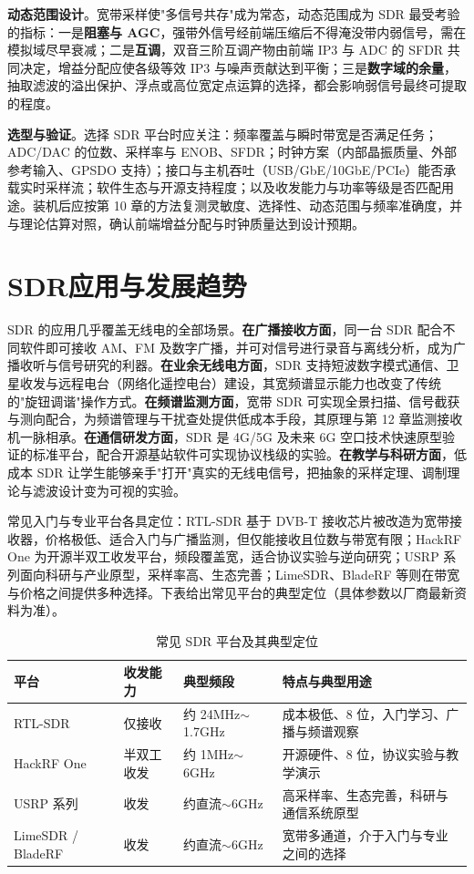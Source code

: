 \textbf{动态范围设计}。宽带采样使"多信号共存"成为常态，动态范围成为 SDR 最受考验的指标：一是\textbf{阻塞与 AGC}，强带外信号经前端压缩后不得淹没带内弱信号，需在模拟域尽早衰减；二是\textbf{互调}，双音三阶互调产物由前端 IP3 与 ADC 的 SFDR 共同决定，增益分配应使各级等效 IP3 与噪声贡献达到平衡；三是\textbf{数字域的余量}，抽取滤波的溢出保护、浮点或高位宽定点运算的选择，都会影响弱信号最终可提取的程度。

\textbf{选型与验证}。选择 SDR 平台时应关注：频率覆盖与瞬时带宽是否满足任务；ADC/DAC 的位数、采样率与 ENOB、SFDR；时钟方案（内部晶振质量、外部参考输入、GPSDO 支持）；接口与主机吞吐（USB/GbE/10GbE/PCIe）能否承载实时采样流；软件生态与开源支持程度；以及收发能力与功率等级是否匹配用途。装机后应按第 10 章的方法复测灵敏度、选择性、动态范围与频率准确度，并与理论估算对照，确认前端增益分配与时钟质量达到设计预期。

\section{SDR应用与发展趋势}
\label{sec:sdr_applications}

SDR 的应用几乎覆盖无线电的全部场景。\textbf{在广播接收方面}，同一台 SDR 配合不同软件即可接收 AM、FM 及数字广播，并可对信号进行录音与离线分析，成为广播收听与信号研究的利器。\textbf{在业余无线电方面}，SDR 支持短波数字模式通信、卫星收发与远程电台（网络化遥控电台）建设，其宽频谱显示能力也改变了传统的"旋钮调谐"操作方式。\textbf{在频谱监测方面}，宽带 SDR 可实现全景扫描、信号截获与测向配合，为频谱管理与干扰查处提供低成本手段，其原理与第 12 章监测接收机一脉相承。\textbf{在通信研发方面}，SDR 是 4G/5G 及未来 6G 空口技术快速原型验证的标准平台，配合开源基站软件可实现协议栈级的实验。\textbf{在教学与科研方面}，低成本 SDR 让学生能够亲手"打开"真实的无线电信号，把抽象的采样定理、调制理论与滤波设计变为可视的实验。

常见入门与专业平台各具定位：RTL-SDR 基于 DVB-T 接收芯片被改造为宽带接收器，价格极低、适合入门与广播监测，但仅能接收且位数与带宽有限；HackRF One 为开源半双工收发平台，频段覆盖宽，适合协议实验与逆向研究；USRP 系列面向科研与产业原型，采样率高、生态完善；LimeSDR、BladeRF 等则在带宽与价格之间提供多种选择。下表给出常见平台的典型定位（具体参数以厂商最新资料为准）。

\begin{table}[htbp]
\centering
\caption{常见 SDR 平台及其典型定位}
\label{tab:sdr_devices}
\begin{tabular}{|p{2.6cm}|p{2.4cm}|p{3.4cm}|p{5.2cm}|}
\hline
\textbf{平台} & \textbf{收发能力} & \textbf{典型频段} & \textbf{特点与典型用途} \\
\hline
RTL-SDR & 仅接收 & 约 24MHz$\sim$1.7GHz & 成本极低、8 位，入门学习、广播与频谱观察 \\
\hline
HackRF One & 半双工收发 & 约 1MHz$\sim$6GHz & 开源硬件、8 位，协议实验与教学演示 \\
\hline
USRP 系列 & 收发 & 约直流$\sim$6GHz & 高采样率、生态完善，科研与通信系统原型 \\
\hline
LimeSDR / BladeRF & 收发 & 约直流$\sim$6GHz & 宽带多通道，介于入门与专业之间的选择 \\
\hline
\end{tabular}
\end{table}

